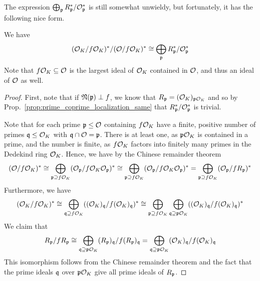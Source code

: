 The expression $\bigoplus_\p R_\p^*/\O_\p^*$ is still somewhat unwieldy, but fortunately, it has the following nice form.
\begin{lemma}
    We have
    \begin{equation*}
        (\O_K/f\O_K)^*/(\O/f\O_K)^* \cong \bigoplus_\p R_\p^*/\O_\p^*
    \end{equation*}
    Note that $f\O_K \subseteq \O$ is the largest ideal of $\O_K$ contained in $\O$, and thus an ideal of $\O$ as well.
\end{lemma}
\begin{proof}
    First, note that if $\Norm(\p) \perp f$, we know that $R_\p = (\O_K)_{\p\O_K}$ and so by Prop.~\ref{prop:prime_coprime_localization_same} that $R_\p^*/\O_\p^*$ is trivial.
    
    Note that for each prime $\p \leq \O$ containing $f\O_K$ have a finite, positive number of primes $\q \leq \O_K$ with $\q \cap \O = \p$.
    There is at least one, as $\p\O_K$ is contained in a prime, and the number is finite, as $f\O_K$ factors into finitely many primes in the Dedekind ring $\O_K$.
    Hence, we have by the Chinese remainder theorem
    \begin{equation*}
        (\O/f\O_K)^* \cong \bigoplus_{\p \supseteq f\O_K} (\O_\p/f\O_K\O_\p)^* \cong \bigoplus_{\p \supseteq f\O_K} (\O_\p/f\O_K\O_\p)^* = \bigoplus_{\p \supseteq f\O_K} (\O_\p/fR_\p)^*
    \end{equation*}
    Furthermore, we have
    \begin{equation*}
        (\O_K/f\O_K)^* \cong \bigoplus_{\q \supseteq f\O_K} ((\O_K)_\q/f(\O_K)_\q)^* \cong \bigoplus_{\p \supseteq f\O_K} \bigoplus_{\q \supseteq \p\O_K} ((\O_K)_\q/f(\O_K)_\q)^*
    \end{equation*}
    We claim that
    \begin{equation*}
        R_\p/fR_\p \cong \bigoplus_{\q \supseteq \p\O_K} (R_\p)_\q/f(R_\p)_\q = \bigoplus_{\q \supseteq \p\O_K} (\O_K)_\q/f(\O_K)_\q
    \end{equation*}
    This isomorphism follows from the Chinese remainder theorem and the fact that the prime ideals $\q$ over $\p\O_K$ give all prime ideals of $R_\p$.
    

\end{proof}
